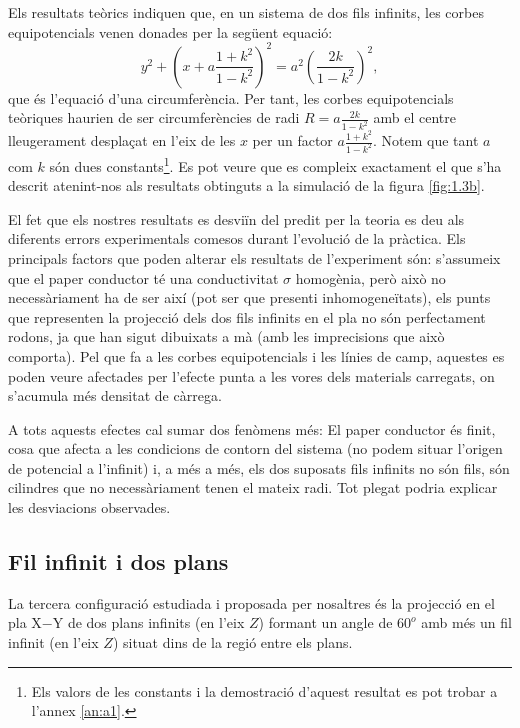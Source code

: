 \documentclass[a4paper,10.5pt]{report}
\begin{document}
Els resultats teòrics indiquen que, en un sistema de dos fils infinits, les corbes equipotencials venen donades per la següent equació:
\begin{equation}
	y^2+\left( x+a\frac{1+k^2}{1-k^2}\right)^2 = a^2\left( \frac{2k}{1-k^2}\right)^2  \label{eqsuppon},
\end{equation}
que és l'equació d'una circumferència. Per tant, les corbes equipotencials teòriques haurien de ser circumferències de radi $R = a\frac{2k}{1-k^2}$ amb el centre lleugerament desplaçat en l'eix de les $x$ per un factor $a\frac{1+k^2}{1-k^2}$. Notem que tant $a$ com $k$ són dues constants\footnote{Els valors de les constants i la demostració d'aquest resultat es pot trobar a l'annex \ref{an:a1}.}. Es pot veure que es compleix exactament el que s'ha descrit atenint-nos als resultats obtinguts a la simulació de la figura \ref{fig:1.3b}.

El fet que els nostres resultats es desviïn del predit per la teoria es deu als diferents errors experimentals comesos durant l'evolució de la pràctica. Els principals factors que poden alterar els resultats de l'experiment són: s'assumeix que el paper conductor té una conductivitat $\sigma$ homogènia, però això no necessàriament ha de ser així (pot ser que presenti inhomogeneïtats), els punts que representen la projecció dels dos fils infinits en el pla no són perfectament rodons, ja que han sigut dibuixats a mà (amb les imprecisions que això comporta). Pel que fa a les corbes equipotencials i les línies de camp, aquestes es poden veure afectades per l'efecte punta a les vores dels materials carregats, on s'acumula més densitat de càrrega. 

A tots aquests efectes cal sumar dos fenòmens més: El paper conductor és finit, cosa que afecta a les condicions de contorn del sistema (no podem situar l'origen de potencial a l'infinit) i, a més a més, els dos suposats fils infinits no són fils, són cilindres que no necessàriament tenen el mateix radi. Tot plegat podria explicar les desviacions observades.

\subsection{Fil infinit i dos plans}

La tercera configuració estudiada i proposada per nosaltres és la projecció en el pla X$-$Y de dos plans infinits (en l'eix $Z$) formant un angle de $60^o$ amb més un fil infinit (en l'eix $Z$) situat dins de la regió entre els plans.
\end{document}
